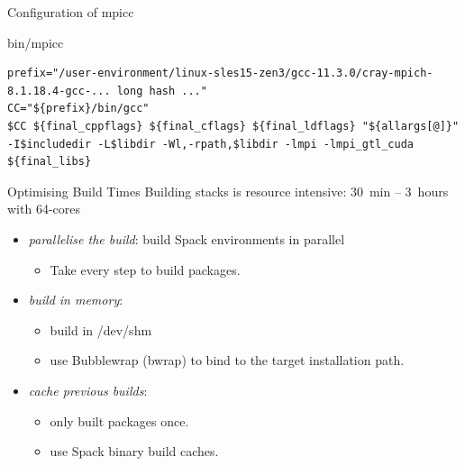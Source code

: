 \documentclass[aspectratio=43]{beamer}
\begin{document}
\begin{frame}[fragile]{Configuration of mpicc}
\begin{code}{bin/mpicc}
    \begin{lstlisting}[style=talkbash]
prefix="/user-environment/linux-sles15-zen3/gcc-11.3.0/cray-mpich-8.1.18.4-gcc-... long hash ..."
CC="${prefix}/bin/gcc"
$CC ${final_cppflags} ${final_cflags} ${final_ldflags} "${allargs[@]}" -I$includedir -L$libdir -Wl,-rpath,$libdir -lmpi -lmpi_gtl_cuda ${final_libs} \end{lstlisting}
\end{code}

\end{frame}

\begin{frame}[fragile]{Optimising Build Times}
    Building stacks is resource intensive: 30~min -- 3~hours with 64-cores

    \begin{itemize}
        \item \emph{parallelise the build}: build Spack environments in parallel
        \begin{itemize}
            \item Take every step to build packages.
        \end{itemize}
        \item \emph{build in memory}:
        \begin{itemize}
            \item build in /dev/shm
            \item use Bubblewrap (bwrap) to bind to the target installation path.
        \end{itemize}
        \item \emph{cache previous builds}:
        \begin{itemize}
            \item only built packages once.
            \item use Spack binary build caches.
        \end{itemize}
    \end{itemize}
\end{frame}
\end{document}
